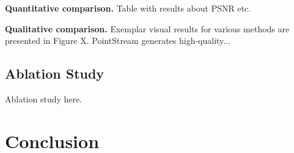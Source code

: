 \noindent

\textbf{Quantitative comparison.} Table with results about PSNR etc.

\noindent

\textbf{Qualitative comparison.} Exemplar visual results for various methods are presented in Figure X. PointStream generates high-quality...

\subsection{Ablation Study}

Ablation study here.

\section{Conclusion}

\balance





